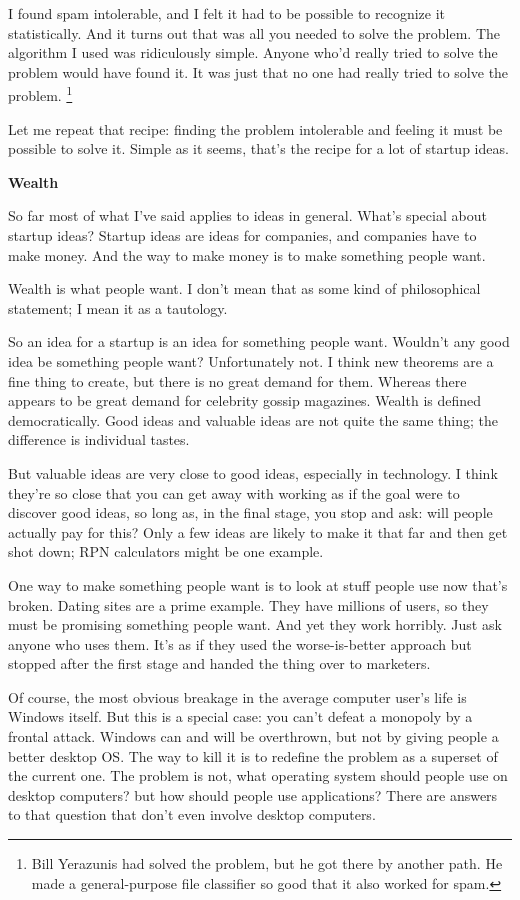 \documentclass[12pt]{book}
\begin{document}
I found spam intolerable, and I felt it had to be possible to recognize
it statistically. And it turns out that was all you needed to solve the
problem. The algorithm I used was ridiculously simple. Anyone who'd
really tried to solve the problem would have found it. It was just that
no one had really tried to solve the problem. \footnote{Bill Yerazunis had solved the problem, but he got there by
another path. He made a general-purpose file classifier so good that it
also worked for spam.}

Let me repeat that recipe: finding the problem intolerable and feeling
it must be possible to solve it. Simple as it seems, that's the recipe
for a lot of startup ideas.

\textbf{Wealth}

So far most of what I've said applies to ideas in general. What's
special about startup ideas? Startup ideas are ideas for companies, and
companies have to make money. And the way to make money is to make
something people want.

Wealth is what people want. I don't mean that as some kind of
philosophical statement; I mean it as a tautology.

So an idea for a startup is an idea for something people want. Wouldn't
any good idea be something people want? Unfortunately not. I think new
theorems are a fine thing to create, but there is no great demand for
them. Whereas there appears to be great demand for celebrity gossip
magazines. Wealth is defined democratically. Good ideas and valuable
ideas are not quite the same thing; the difference is individual tastes.

But valuable ideas are very close to good ideas, especially in
technology. I think they're so close that you can get away with working
as if the goal were to discover good ideas, so long as, in the final
stage, you stop and ask: will people actually pay for this? Only a few
ideas are likely to make it that far and then get shot down; RPN
calculators might be one example.

One way to make something people want is to look at stuff people use now
that's broken. Dating sites are a prime example. They have millions of
users, so they must be promising something people want. And yet they
work horribly. Just ask anyone who uses them. It's as if they used the
worse-is-better approach but stopped after the first stage and handed
the thing over to marketers.

Of course, the most obvious breakage in the average computer user's life
is Windows itself. But this is a special case: you can't defeat a
monopoly by a frontal attack. Windows can and will be overthrown, but
not by giving people a better desktop OS. The way to kill it is to
redefine the problem as a superset of the current one. The problem is
not, what operating system should people use on desktop computers? but
how should people use applications? There are answers to that question
that don't even involve desktop computers.
\end{document}
